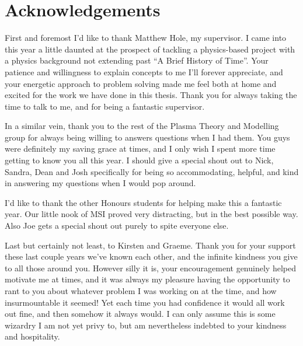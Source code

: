 
\chapter*{Acknowledgements}\label{acknowledgements}


First and foremost I'd like to thank Matthew Hole, my supervisor. I came 
into this year a little daunted at the prospect of tackling a physics-based 
project with a physics background not extending past ``A Brief History of Time''.
Your patience and willingness to explain concepts to me I'll forever appreciate, 
and your energetic approach to problem solving made me feel both at home and excited 
for the work we have done in this thesis. Thank you for always taking the time to talk to 
me, and for being a fantastic supervisor.

In a similar vein, thank you to the rest of the Plasma Theory and Modelling group for always being 
willing to answers questions when I had them. You guys were definitely my saving grace 
at times, and I only wish I spent more time getting to know you all this year. I should give 
a special shout out to Nick, Sandra, Dean and Josh specifically for being so 
accommodating, helpful, and kind in answering my questions when I would pop around. 

I'd like to thank the other Honours students for helping make this a fantastic 
year. Our little nook of MSI proved very distracting, but in the best possible 
way. Also Joe gets a special shout out purely to spite everyone else.

Last but certainly not least, to Kirsten and Graeme. Thank you for your support these last 
couple years we've known each other, and the infinite kindness you give to all those around you. However silly it is,
your encouragement genuinely helped motivate me at times, and it was always my pleasure having the 
opportunity to rant to you about whatever problem I was working on at the time, and how insurmountable
it seemed! Yet each time you had confidence it would all work out fine, and then somehow it always would. I can only assume 
this is some wizardry I am not yet privy to, but am nevertheless indebted to your kindness and hospitality.